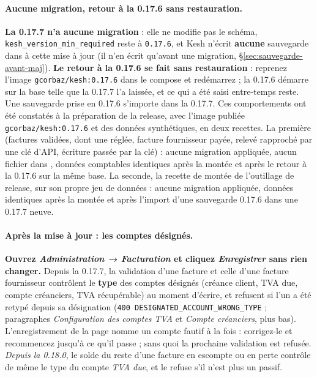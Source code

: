 \documentclass[a4paper,11pt,oneside]{article}
\begin{document}
\paragraph{Aucune migration, retour à la 0.17.6 sans restauration.} \textbf{La 0.17.7 n'a aucune migration} : elle ne modifie pas le schéma, \texttt{kesh\_version\_min\_required} reste à \texttt{0.17.6}, et Kesh n'écrit \textbf{aucune} sauvegarde dans  à cette mise à jour (il n'en écrit qu'avant une migration, \S\ref{sec:sauvegarde-avant-maj}). \textbf{Le retour à la 0.17.6 se fait sans restauration} : reprenez l'image \texttt{gcorbaz/kesh:0.17.6} dans le compose et redémarrez ; la 0.17.6 démarre sur la base telle que la 0.17.7 l'a laissée, et ce qui a été saisi entre-temps reste. Une sauvegarde  prise en 0.17.6 s'importe dans la 0.17.7. Ces comportements ont été constatés à la préparation de la release, avec l'image publiée \texttt{gcorbaz/kesh:0.17.6} et des données synthétiques, en deux recettes. La première (factures validées, dont une réglée, facture fournisseur payée, relevé rapproché par une clé d'API, écriture passée par la clé) : aucune migration appliquée, aucun fichier dans , données comptables identiques après la montée et après le retour à la 0.17.6 sur la même base. La seconde, la recette de montée de l'outillage de release, sur son propre jeu de données : aucune migration appliquée, données identiques après la montée et après l'import d'une sauvegarde 0.17.6 dans une 0.17.7 neuve.

\paragraph{Après la mise à jour : les comptes désignés.} \textbf{Ouvrez \emph{Administration → Facturation} et cliquez \emph{Enregistrer} sans rien changer.} Depuis la 0.17.7, la validation d'une facture et celle d'une facture fournisseur contrôlent le \textbf{type} des comptes désignés (créance client, TVA due, compte créanciers, TVA récupérable) au moment d'écrire, et refusent si l'un a été retypé depuis sa désignation (\texttt{400 DESIGNATED\_ACCOUNT\_WRONG\_TYPE} ; paragraphes \emph{Configuration des comptes TVA} et \emph{Compte créanciers}, plus bas). L'enregistrement de la page nomme un compte fautif à la fois : corrigez-le et recommencez jusqu'à ce qu'il passe ; sans quoi la prochaine validation est refusée. \emph{Depuis la 0.18.0}, le solde du reste d'une facture en escompte ou en perte contrôle de même le type du compte \emph{TVA due}, et le refuse s'il n'est plus un passif.
\end{document}
